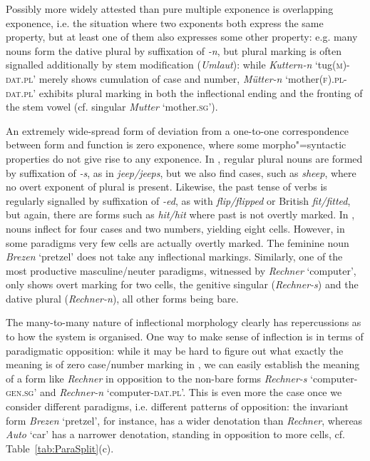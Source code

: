 \documentclass[output=paper
	        ,collection
	        ,collectionchapter
 	        ,biblatex
                ,babelshorthands
                ,newtxmath
                ,draftmode
                ,colorlinks, citecolor=brown
]{langscibook}
\begin{document}
Possibly more widely attested than pure multiple exponence is
overlapping exponence, i.e. the situation where two exponents both
express the same property, but at least one of them also expresses
some other property: e.g. many  nouns form the dative plural by
suffixation of \textit{-n}, but plural marking is often signalled
additionally by stem modification (\textit{Umlaut}): while
\textit{Kuttern-n} `tug(\textsc{m})-\textsc{dat.pl}' merely shows
cumulation of case and number, \textit{Mütter-n}
`mother(\textsc{f}).\textsc{pl}-\textsc{dat.pl}' exhibits plural
marking in both the inflectional ending and the fronting of the stem
vowel (cf. singular \textit{Mutter} `mother.\textsc{sg}').

An extremely wide-spread form of deviation from a one-to-one
correspondence between form and function is zero exponence, where some
morpho"=syntactic properties do not give rise to any exponence. In
, regular plural nouns are formed by suffixation of
\textit{-s}, as in \textit{jeep/jeeps}, but we also find cases, such
as \textit{sheep}, where no overt exponent of plural is
present. Likewise, the past tense of  verbs is regularly
signalled by suffixation of \textit{-ed}, as with
\textit{flip/flipped} or British  \textit{fit/fitted}, but
again, there are forms such as \textit{hit/hit} where past is not
overtly marked.  In , nouns inflect for four cases and two
numbers, yielding eight cells. However, in some paradigms very few
cells are actually overtly marked. The feminine noun \textit{Brezen}
`pretzel' does not take any inflectional markings. Similarly, one of
the most productive masculine/neuter paradigms, witnessed by
\textit{Rechner} `computer', only shows overt marking for two cells,
the genitive singular (\textit{Rechner-s}) and the dative plural
(\textit{Rechner-n}), all other forms being bare.



The many-to-many nature of inflectional morphology clearly has
repercussions as to how the system is organised.  One way to make
sense of inflection is in terms of paradigmatic opposition: while it
may be hard to figure out what exactly the meaning is of zero
case/number marking in , we can easily establish the meaning of
a form like \textit{Rechner} in opposition to the non-bare forms
\textit{Rechner-s} `computer-\textsc{gen.sg}' and \textit{Rechner-n}
`computer-\textsc{dat.pl}'. This is even more the case once we
consider different paradigms, i.e. different patterns of opposition:
the invariant form \textit{Brezen} `pretzel', for instance, has a wider
denotation than \textit{Rechner}, whereas \textit{Auto}
`car' has a narrower denotation,  standing in
opposition to more cells, cf. Table~\ref{tab:ParaSplit}(c).    
\end{document}
